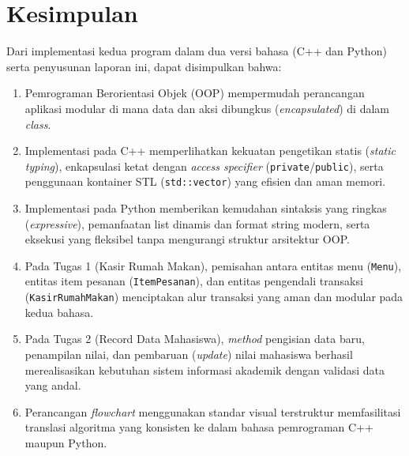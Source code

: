 \documentclass[12pt,a4paper]{article}
\begin{document}
\section{Kesimpulan}
Dari implementasi kedua program dalam dua versi bahasa (C++ dan Python) serta penyusunan laporan ini, dapat disimpulkan bahwa:
\begin{enumerate}
    \item Pemrograman Berorientasi Objek (OOP) mempermudah perancangan aplikasi modular di mana data dan aksi dibungkus (\textit{encapsulated}) di dalam \textit{class}.
    \item Implementasi pada C++ memperlihatkan kekuatan pengetikan statis (\textit{static typing}), enkapsulasi ketat dengan \textit{access specifier} (\texttt{private}/\texttt{public}), serta penggunaan kontainer STL (\texttt{std::vector}) yang efisien dan aman memori.
    \item Implementasi pada Python memberikan kemudahan sintaksis yang ringkas (\textit{expressive}), pemanfaatan list dinamis dan format string modern, serta eksekusi yang fleksibel tanpa mengurangi struktur arsitektur OOP.
    \item Pada Tugas 1 (Kasir Rumah Makan), pemisahan antara entitas menu (\texttt{Menu}), entitas item pesanan (\texttt{ItemPesanan}), dan entitas pengendali transaksi (\texttt{KasirRumahMakan}) menciptakan alur transaksi yang aman dan modular pada kedua bahasa.
    \item Pada Tugas 2 (Record Data Mahasiswa), \textit{method} pengisian data baru, penampilan nilai, dan pembaruan (\textit{update}) nilai mahasiswa berhasil merealisasikan kebutuhan sistem informasi akademik dengan validasi data yang andal.
    \item Perancangan \textit{flowchart} menggunakan standar visual terstruktur memfasilitasi translasi algoritma yang konsisten ke dalam bahasa pemrograman C++ maupun Python.
\end{enumerate}
\end{document}
